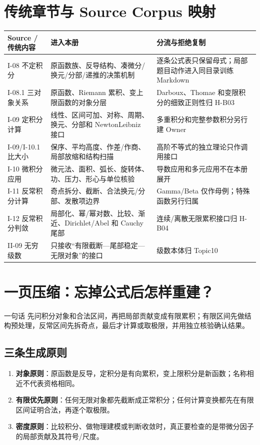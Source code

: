 \documentclass[11pt,a4paper,fontset=fandol]{ctexart}
\newcommand{\kw}[1]{\textbf{\color{deep}#1}}
\begin{document}
\section{传统章节与 Source Corpus 映射}

\begin{longtable}{L{2.55cm}L{5.35cm}L{\dimexpr\linewidth-7.90cm\relax}}
\toprule
\textbf{Source / 传统内容} & \textbf{进入本册} & \textbf{分流与拒绝复制}\\
\midrule
I-08 不定积分 & 原函数族、反导结构、凑微分/换元/分部/递推的决策机制 & 逐条公式表只保留母式；局部题目动作进入同目录训练 Markdown\\
I-08.1 三对象关系 & 原函数、Riemann 累积、变上限函数的对象分层 & Darboux、Thomae 和变限积分的细致正则性归 H-B03\\
I-09 定积分计算 & 线性、区间可加、对称、周期、换元、分部和 Newton\textendash{}Leibniz 接口 & 多重积分和完整参数积分另行建 Owner\\
I-09/I-10.1 比大小 & 保序、平均高度、作差/作商、局部放缩和结构扫描 & 高阶不等式的独立理论只作调用接口\\
I-10 微积分应用 & 微元法、面积、弧长、旋转体、功、压力、形心与单位核验 & 导数应用和多元应用不在本册展开\\
I-11 反常积分计算 & 奇点拆分、截断、合法换元/分部、发散项边界 & Gamma/Beta 仅作母例；特殊函数另行归属\\
I-12 反常积分判敛 & 局部化、幂/幂对数、比较、渐近、Dirichlet/Abel 和 Cauchy 尾部 & 连续/离散无限累积接口归 H-B04\\
II-09 无穷级数 & 只接收“有限截断—尾部稳定—无限对象”的接口 & 级数本体归 Topic10\\
\bottomrule
\end{longtable}

\section{一页压缩：忘掉公式后怎样重建？}

\begin{corebox}{一句话}
先问积分对象和合法区间，再把局部贡献变成有限累积；有限区间先做结构预处理，反常区间先拆奇点，最后才计算或取极限，并用独立核验确认结果。
\end{corebox}

\subsection{三条生成原则}
\begin{enumerate}
  \item \kw{对象原则}：原函数是反导，定积分是有向累积，变上限积分是新函数；名称相近不代表资格相同。
  \item \kw{有限优先原则}：任何无限对象都先截断成正常积分；任何计算变换都先在有限区间证明合法，再逐个取极限。
  \item \kw{密度原则}：比较积分、做物理建模或判断收敛时，真正要检查的是带微分因子的局部贡献及其符号/尺度。
\end{enumerate}
\end{document}
